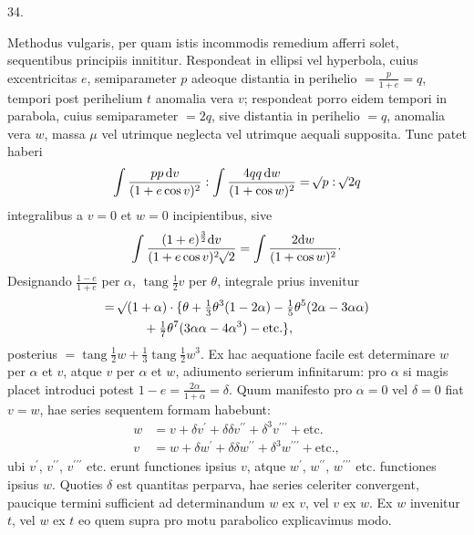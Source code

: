 \begin{center}
\hypertarget{native-051-article034}{}34.
\end{center}
Methodus vulgaris, per quam istis incommodis remedium afferri solet, sequentibus principiis innititur. Respondeat in ellipsi vel hyperbola, cuius excentricitas $e$, semiparameter $p$ adeoque distantia in perihelio $=\frac{p}{1+e}=q$, tempori post perihelium $t$ anomalia vera $v$; respondeat porro eidem tempori in parabola, cuius semiparameter $=2q$, sive distantia in perihelio $=q$, anomalia vera $w$, massa $\mu$ vel utrimque neglecta vel utrimque aequali supposita. Tunc patet haberi
\[
\int\frac{pp\,\mathrm{d}v}{(1+e\cos v)^2}:\int\frac{4qq\,\mathrm{d}w}{(1+\cos w)^2}=\mathord{{}^{}\!\surd}p:\mathord{{}^{}\!\surd}2q
\]
integralibus a $v=0$ et $w=0$ incipientibus, sive
\[
\int\frac{(1+e)^{\frac{3}{2}}\mathrm{d}v}{(1+e\cos v)^2\BareRoot{2}}=\int\frac{2\mathrm{d}w}{(1+\cos w)^2}\raisebox{.45ex}{.}
\]
Designando $\frac{1-e}{1+e}$ per $\alpha$, $\operatorname{tang}\frac{1}{2}v$ per $\theta$, integrale prius invenitur
\[
\begin{aligned}
={}&\mathord{{}^{}\!\surd}(1+\alpha)\cdot\{\theta+\tfrac{1}{3}\theta^3(1-2\alpha)-\tfrac{1}{5}\theta^5(2\alpha-3\alpha\alpha)\\
&\qquad+\tfrac{1}{7}\theta^7(3\alpha\alpha-4\alpha^3)-\text{etc.}\},
\end{aligned}
\]
posterius $=\operatorname{tang}\frac{1}{2}w+\frac{1}{3}\operatorname{tang}\frac{1}{2}w^3$. Ex hac aequatione facile est determinare $w$ per $\alpha$ et $v$, atque $v$ per $\alpha$ et $w$, adiumento serierum infinitarum: pro $\alpha$ si magis placet introduci potest $1-e=\frac{2\alpha}{1+\alpha}=\delta$. Quum manifesto pro $\alpha=0$ vel $\delta=0$ fiat $v=w$, hae series sequentem formam habebunt:
\[
\begin{aligned}
w&=v+\delta v^{\prime}+\delta\delta v^{\prime\prime}+\delta^3v^{\prime\prime\prime}+\text{etc.}\\
v&=w+\delta w^{\prime}+\delta\delta w^{\prime\prime}+\delta^3w^{\prime\prime\prime}+\text{etc.},
\end{aligned}
\]
ubi $v^{\prime}$, $v^{\prime\prime}$, $v^{\prime\prime\prime}$ etc. erunt functiones ipsius $v$, atque $w^{\prime}$, $w^{\prime\prime}$, $w^{\prime\prime\prime}$ etc. functiones ipsius $w$. Quoties $\delta$ est quantitas perparva, hae series celeriter convergent, paucique termini sufficient ad determinandum $w$ ex $v$, vel $v$ ex $w$. Ex $w$ invenitur $t$, vel $w$ ex $t$ eo quem supra pro motu parabolico explicavimus modo.

